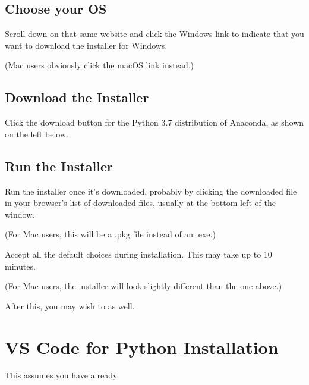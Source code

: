 \documentclass[letterpaper,10pt,english]{jupyterBook}
\begin{document}
\sphinxAtStartPar



\section{Choose your OS}
\label{\detokenize{anaconda-installation:choose-your-os}}
\sphinxAtStartPar
Scroll down on that same website and click the Windows link to indicate
that you want to download the installer for Windows.

\sphinxAtStartPar


\sphinxAtStartPar
(Mac users obviously click the macOS link instead.)


\section{Download the Installer}
\label{\detokenize{anaconda-installation:download-the-installer}}
\sphinxAtStartPar
Click the download button for the Python 3.7 distribution of Anaconda,
as shown on the left below.

\sphinxAtStartPar



\section{Run the Installer}
\label{\detokenize{anaconda-installation:run-the-installer}}
\sphinxAtStartPar
Run the installer once it’s downloaded, probably by clicking the
downloaded file in your browser’s list of downloaded files, usually at
the bottom left of the window.

\sphinxAtStartPar


\sphinxAtStartPar
(For Mac users, this will be a .pkg file instead of an .exe.)

\sphinxAtStartPar
Accept all the default choices during installation. This may take up to
10 minutes.

\sphinxAtStartPar


\sphinxAtStartPar
(For Mac users, the installer will look slightly different than the one
above.)

\sphinxAtStartPar
After this, you may wish to {\hyperref[\detokenize{vs-code-installation::doc}]{}} as well.


\chapter{VS Code for Python Installation}
\label{\detokenize{vs-code-installation:vs-code-for-python-installation}}\label{\detokenize{vs-code-installation::doc}}
\sphinxAtStartPar
This assumes you have {\hyperref[\detokenize{anaconda-installation::doc}]{}} already.
\end{document}
